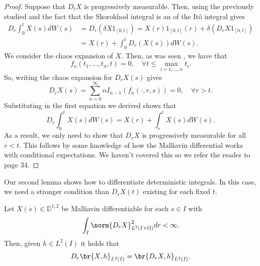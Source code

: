 \documentclass[
    a4paper,
    DIV=14,
    abstract=true,
    numbers=noenddot
]{scrartcl}
\begin{document}
\begin{proof}
	Suppose that $D_tX$ is progressively measurable. Then, using the previously studied     and the fact that the Skorokhod integral is an  of the Itô integral  gives
	\begin{align*}
		D_r \int_{0}^t X(s) dW(s) & =D_r(\delta X1_{[0,t]}) =X(r)1_{[0,t]}(r)+\delta (D_rX1_{[0,t]}) \\&=X(r)+\int_{0}^t D_r(X(s)) dW(s).
	\end{align*}
	We consider the chaos expansion of $X$. Then, as was seen , we have that
	\begin{equation*}
		f_n(t_1,\ldots,t_n,t)=0,\quad\forall t\leq\max_{i=1,\ldots,n} t_i .
	\end{equation*}
	So, writing the chaos expansion for $D_rX(s)$  gives
	\begin{equation*}
		D_rX(s)=\sum_{n=0}^{\infty}  nI_{n-1}(f_n(\cdot ,r,s))=0, \quad\forall r>t.
	\end{equation*}
	Substituting in the first equation we derived shows that
	\begin{equation*}
		D_r \int_{0}^t X(s) dW(s)=X(r)+\int_{r}^t X(s) dW(s).
	\end{equation*}
	As a result, we only need to show that $D_r X$ is progressively measurable for all $r<t$.	This follows by some knowledge of how the Malliavin differential works with conditional expectations. We haven't covered this so we refer the reader to \cite{nunno2008malliavin} page 34.
\end{proof}
Our second lemma shows how to differentiate deterministic integrals. In this case, we need a stronger condition than $D_rX(t)$ existing for each fixed $t$.
\begin{lemma}
	Let $X(s)\in \mathbb{D}^{1,2}$ be Malliavin differentiable for each $s\in I$ with
	\begin{equation*}
		\int_{I} \norm{D_rX}_{L^2(I\times\Omega)}^2dr<\infty.
		\end{equation*}
	Then, given $h\in L^2(I)$ it holds that
	\begin{equation*}
		D_r\br{X,h}_{L^2(I)}=\br{D_rX,h}_{L^2(I)}.
	\end{equation*}
\end{lemma}
\end{document}
